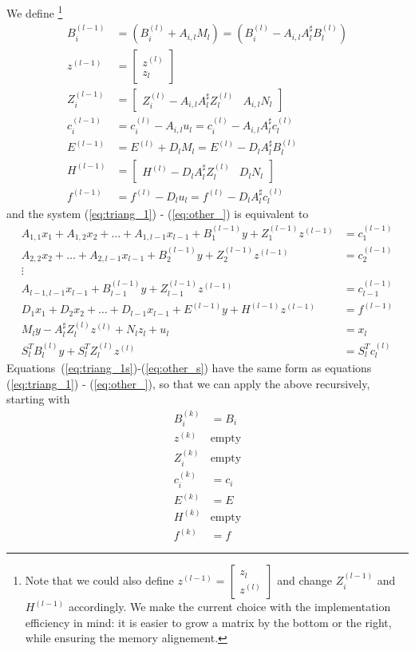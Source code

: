 \documentclass[]{article}
\theoremstyle{definition}
\newcommand{\BIN}{\begin{bmatrix}}
\newcommand{\BOUT}{\end{bmatrix}}
\begin{document}
We define
\footnote{
Note that we could also define $z^{(l-1)} = \BIN z_l \\ z^{(l)} \BOUT$ and change $Z_i^{(l-1)}$ and $H^{(l-1)}$ accordingly. We make the current choice with the implementation efficiency in mind: it is easier to grow a matrix by the bottom or the right, while ensuring the memory alignement.
}
\begin{align*}
B_i^{(l-1)} &= (B_i^{(l)} + A_{i,l} M_l) = (B_i^{(l)} - A_{i,l} A_l^\sharp B_l^{(l)})\\
z^{(l-1)} &= \BIN z^{(l)}\\ z_l \BOUT\\
Z_i^{(l-1)} &= \BIN Z_i^{(l)} - A_{i,l} A_l^\sharp Z_l^{(l)} & A_{i,l}  N_l\BOUT\\
c_i^{(l-1)} &= c_i^{(l)} - A_{i,l} u_l = c_i^{(l)} - A_{i,l} A_l^\sharp c_l^{(l)}\\
E^{(l-1)} &= E^{(l)} + D_l M_l = E^{(l)} - D_l A_l^\sharp B_l^{(l)}\\
H^{(l-1)} &= \BIN H^{(l)} - D_l A_l^\sharp Z_l^{(l)} & D_l N_l\BOUT\\
f^{(l-1)} &= f^{(l)} - D_l u_l = f^{(l)} - D_l A_l^\sharp c_l^{(l)}
\end{align*}
and the system (\ref{eq:triang_1}) - (\ref{eq:other_}) is equivalent to
\begin{align}
A_{1,1} x_1 + A_{1,2} x_2 + \ldots + A_{1,l-1} x_{l-1} + B_1^{(l-1)} y + Z_1^{(l-1)} z^{(l-1)}&= c_1^{(l-1)}  \label{eq:triang_1s}\\
A_{2,2} x_2 + \ldots + A_{2,l-1} x_{l-1} + B_2^{(l-1)} y + Z_2^{(l-1)} z^{(l-1)}&= c_2^{(l-1)}\\
\vdots& \nonumber\\
A_{l-1,l-1} x_{l-1} + B_{l-1}^{(l-1)} y + Z_{l-1}^{(l-1)} z^{(l-1)}&= c_{l-1}^{(l-1)}\\
D_1 x_1 + D_2 x_2 + \ldots + D_{l-1} x_{l-1} + E^{(l-1)} y + H^{(l-1)} z^{(l-1)}&= f^{(l-1)} \label{eq:other_s}\\
M_l y -A_l^\sharp Z_l^{(l)} z^{(l)} + N_l z_l + u_l &= x_l\\
	S_l^T B_l^{(l)} y + S_l^T Z_l^{(l)} z^{(l)} &= S_l^T c_l^{(l)}
\end{align}
Equations~(\ref{eq:triang_1s})-(\ref{eq:other_s}) have the same form as equations (\ref{eq:triang_1}) - (\ref{eq:other_}), so that we can apply the above recursively, starting with
\begin{align*}
B_i^{(k)} &= B_i\\
z^{(k)} &\mathrm{empty}\\
Z_i^{(k)} & \mathrm{empty}\\
c_i^{(k)} &= c_i\\
E^{(k)} &= E\\
H^{(k)} & \mathrm{empty} \\
f^{(k)} &= f
\end{align*}
\end{document}
